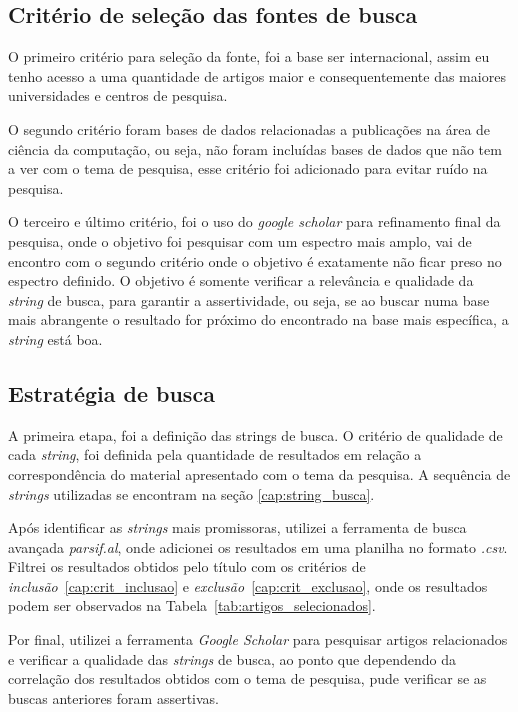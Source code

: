 \documentclass[conference]{IEEEtran}
\begin{document}
\subsection{Critério de seleção das fontes de busca}
O primeiro critério para seleção da fonte, foi a base ser internacional, assim eu tenho acesso a uma quantidade de artigos maior e consequentemente das maiores universidades e centros de pesquisa.

O segundo critério foram bases de dados relacionadas a publicações na área de ciência da computação, ou seja, não foram incluídas bases de dados que não tem a ver com o tema de pesquisa, esse critério foi adicionado para evitar ruído na pesquisa.

O terceiro e último critério, foi o uso do \emph{google scholar} para refinamento final da pesquisa, onde o objetivo foi pesquisar com um espectro mais amplo, vai de encontro com o segundo critério onde o objetivo é exatamente não ficar preso no espectro definido. O objetivo é somente verificar a relevância e qualidade da \emph{string} de busca, para garantir a assertividade, ou seja, se ao buscar numa base mais abrangente o resultado for próximo do encontrado na base mais específica, a \emph{string} está boa.

\subsection{Estratégia de busca}
A primeira etapa, foi a definição das strings de busca. O critério de qualidade de cada \emph{string}, foi definida pela quantidade de resultados em relação a correspondência do material apresentado com o tema da pesquisa. A sequência de \emph{strings} utilizadas se encontram na seção \ref{cap:string_busca}.

Após identificar as \emph{strings} mais promissoras, utilizei a ferramenta de busca avançada \emph{parsif.al}, onde adicionei os resultados em uma planilha no formato \emph{.csv}. Filtrei os resultados obtidos pelo título com os critérios de \emph{inclusão}~\ref{cap:crit_inclusao} e \emph{exclusão}~\ref{cap:crit_exclusao}, onde os resultados podem ser observados na Tabela~\ref{tab:artigos_selecionados}.

Por final, utilizei a ferramenta \emph{Google Scholar} para pesquisar artigos relacionados e verificar a qualidade das \emph{strings} de busca, ao ponto que dependendo da correlação dos resultados obtidos com o tema de pesquisa, pude verificar se as buscas anteriores foram assertivas.
\end{document}
